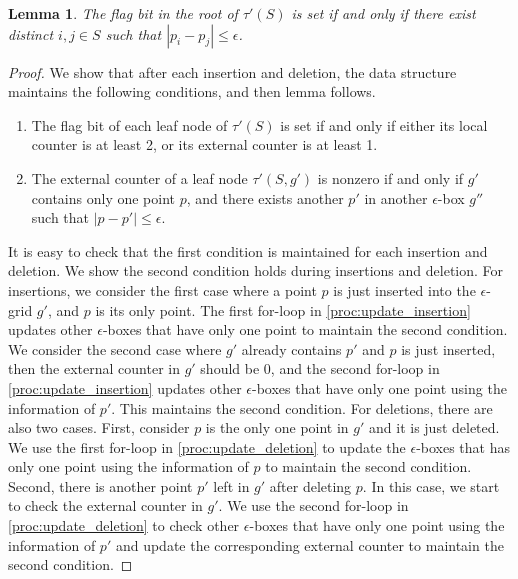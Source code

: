 \documentclass[10pt,a4paper]{article}
\newtheorem{lemma}[theorem]{Lemma}
\begin{document}
\begin{lemma}
  The flag bit in the root of $\tau'(S)$ is set if and only if there exist  distinct $i, j \in S$ such that $|p_i - p_j| \leq \epsilon$.
\end{lemma}
\begin{proof}
  We show that after each insertion and deletion, the data structure maintains the following conditions, and then lemma follows.
  \begin{enumerate}
    \item The flag bit of each leaf node of $\tau'(S)$ is set if and only if either its local counter is at least 2, or its external counter is at least 1.
    \item The external counter of a leaf node $\tau'(S, g')$ is nonzero if and only if $g'$ contains only one point $p$, and there exists another $p'$ in another $\epsilon$-box $g''$ such that $|p - p'| \leq \epsilon$.
  \end{enumerate}
  It is easy to check that the first condition is maintained for each insertion and deletion. We show the second condition holds during insertions and deletion. For insertions, we consider the first case where a point $p$ is just inserted into the $\epsilon$-grid $g'$, and $p$ is its only point. The first for-loop in \cref{proc:update_insertion} updates other $\epsilon$-boxes that have only one point to maintain the second condition. We consider the second case where $g'$ already contains $p'$ and $p$ is just inserted, then the external counter in $g'$ should be 0, and the second for-loop in \cref{proc:update_insertion} updates other $\epsilon$-boxes that have only one point using the information of $p'$. This maintains the second condition. For deletions, there are also two cases. First, consider $p$ is the only one point in $g'$ and it is just deleted. We use the first for-loop in \cref{proc:update_deletion} to update the $\epsilon$-boxes that has only one point using the information of $p$ to maintain the second condition. Second, there is another point $p'$ left in $g'$ after deleting $p$. In this case, we start to check the external counter in $g'$. We use the second for-loop in \cref{proc:update_deletion} to check other $\epsilon$-boxes that have only one point using the information of $p'$ and update the corresponding external counter to maintain the second condition.
\end{proof}
\end{document}
